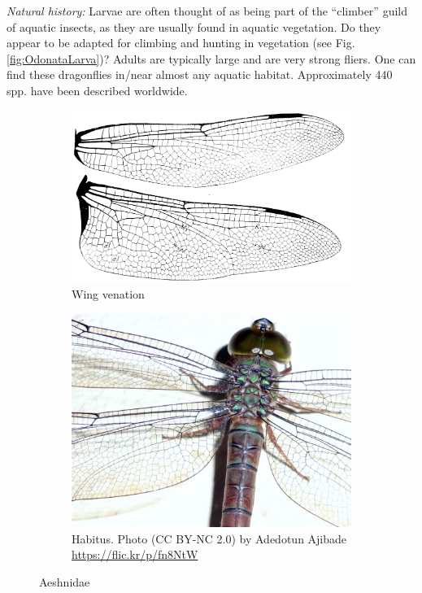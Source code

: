 \documentclass[letterpaper, 11pt]{article}
\begin{document}
\noindent{}\textit{Natural history:} Larvae are often thought of as being part of the ``climber'' guild of aquatic insects, as they are usually found in aquatic vegetation. Do they appear to be adapted for climbing and hunting in vegetation (see Fig. \ref{fig:OdonataLarva})? Adults are typically large and are very strong fliers. One can find these dragonflies in/near almost any aquatic habitat. Approximately 440 spp. have been described worldwide.\\

\begin{figure}[ht!]
    \centering
    \begin{subfigure}[ht!]{0.48\textwidth}
        \includegraphics[width=\textwidth]{AeshnidWings}
        \caption{Wing venation \citep[][Fig. 236]{comstock1918wings}}
        \label{fig:aeshnid1}
    \end{subfigure}
    \hfill
    \begin{subfigure}[ht!]{0.42\textwidth}
        \includegraphics[width=\textwidth]{AeshnidHabitus}
        \caption{Habitus. Photo (CC BY-NC 2.0) by Adedotun Ajibade \url{https://flic.kr/p/fn8NtW}}
        \label{fig:aeshnid2}
    \end{subfigure}
    \caption{Aeshnidae}\label{fig:aeshnids}
\end{figure}
\end{document}
